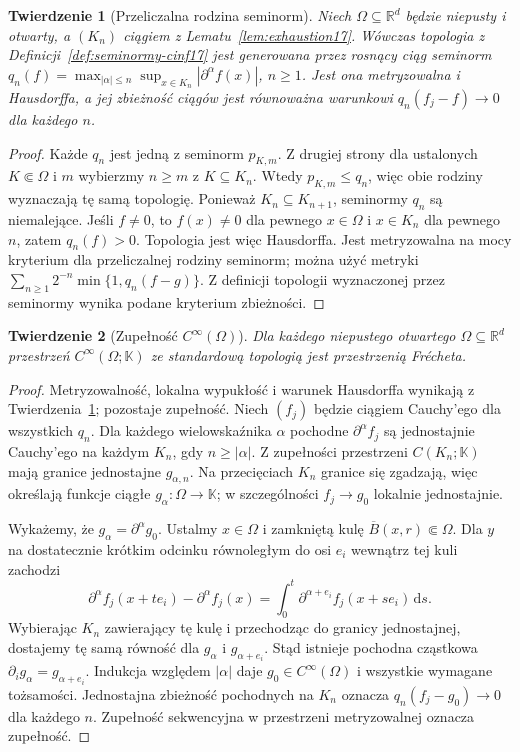 \documentclass[11pt,a4paper]{article}
\numberwithin{equation}{section}
\theoremstyle{plain}
\newtheorem{twierdzenie}{Twierdzenie}[section]
\theoremstyle{definition}
\theoremstyle{remark}
\newcommand{\R}{\mathbb R}
\newcommand{\K}{\mathbb K}
\begin{document}
\begin{twierdzenie}[Przeliczalna rodzina seminorm]
\label{thm:countable-cinf17}
Niech $\Omega\subseteq\R^d$ będzie niepusty i otwarty,
a $(K_n)$ ciągiem z Lematu~\ref{lem:exhaustion17}.
Wówczas topologia z Definicji~\ref{def:seminormy-cinf17}
jest generowana przez rosnący ciąg seminorm
$q_n(f)=\max_{|\alpha|\le n}\sup_{x\in K_n}|\partial^\alpha f(x)|$,
$n\ge1$. Jest ona metryzowalna i Hausdorffa, a jej zbieżność
ciągów jest równoważna warunkowi
$q_n(f_j-f)\to0$ dla każdego $n$.
\end{twierdzenie}
\begin{proof}
Każde $q_n$ jest jedną z seminorm $p_{K,m}$.
Z drugiej strony dla ustalonych $K\Subset\Omega$ i $m$
wybierzmy $n\ge m$ z $K\subseteq K_n$.
Wtedy $p_{K,m}\le q_n$, więc obie rodziny wyznaczają tę samą
topologię. Ponieważ $K_n\subseteq K_{n+1}$, seminormy $q_n$
są niemalejące. Jeśli $f\ne0$, to $f(x)\ne0$ dla pewnego
$x\in\Omega$ i $x\in K_n$ dla pewnego $n$, zatem $q_n(f)>0$.
Topologia jest więc Hausdorffa. Jest metryzowalna na mocy
kryterium dla przeliczalnej rodziny seminorm; można użyć metryki
$\sum_{n\ge1}2^{-n}\min\{1,q_n(f-g)\}$.
Z definicji topologii wyznaczonej przez seminormy wynika
podane kryterium zbieżności.
\end{proof}

\begin{twierdzenie}[Zupełność $C^\infty(\Omega)$]
\label{thm:frechet-cinf17}
Dla każdego niepustego otwartego $\Omega\subseteq\R^d$ przestrzeń
$C^\infty(\Omega;\K)$ ze standardową topologią jest przestrzenią
Frécheta.
\end{twierdzenie}
\begin{proof}
Metryzowalność, lokalna wypukłość i warunek Hausdorffa wynikają
z Twierdzenia~\ref{thm:countable-cinf17}; pozostaje zupełność.
Niech $(f_j)$ będzie ciągiem Cauchy'ego dla wszystkich $q_n$.
Dla każdego wielowskaźnika $\alpha$ pochodne
$\partial^\alpha f_j$ są jednostajnie Cauchy'ego na każdym
$K_n$, gdy $n\ge|\alpha|$. Z zupełności przestrzeni
$C(K_n;\K)$ mają granice jednostajne $g_{\alpha,n}$.
Na przecięciach $K_n$ granice się zgadzają, więc określają
funkcje ciągłe $g_\alpha:\Omega\to\K$; w szczególności
$f_j\to g_0$ lokalnie jednostajnie.

Wykażemy, że $g_\alpha=\partial^\alpha g_0$.
Ustalmy $x\in\Omega$ i zamkniętą kulę $\overline B(x,r)\Subset\Omega$.
Dla $y$ na dostatecznie krótkim odcinku równoległym do osi $e_i$
wewnątrz tej kuli zachodzi
\[
 \partial^\alpha f_j(x+te_i)-\partial^\alpha f_j(x)
 =\int_0^t\partial^{\alpha+e_i}f_j(x+se_i)\,\mathrm ds.
\]
Wybierając $K_n$ zawierający tę kulę i przechodząc do granicy
jednostajnej, dostajemy tę samą równość dla $g_\alpha$
i $g_{\alpha+e_i}$. Stąd istnieje pochodna cząstkowa
$\partial_i g_\alpha=g_{\alpha+e_i}$.
Indukcja względem $|\alpha|$ daje $g_0\in C^\infty(\Omega)$
i wszystkie wymagane tożsamości. Jednostajna zbieżność
pochodnych na $K_n$ oznacza $q_n(f_j-g_0)\to0$ dla każdego $n$.
Zupełność sekwencyjna w przestrzeni metryzowalnej oznacza zupełność.
\end{proof}
\end{document}

